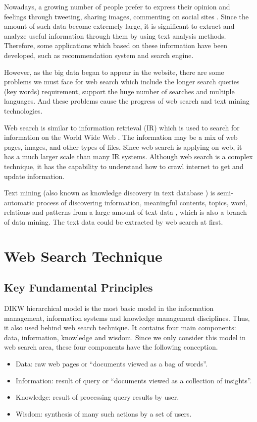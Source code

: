 \documentclass[sigconf]{acmart}
\begin{document}
Nowadays, a growing number of people prefer to express their opinion and feelings through tweeting, sharing images, commenting on social sites \cite{editor01}. Since the amount of such data become extremely large, it is significant to extract and analyze useful information through them by using text analysis methods. Therefore, some applications which based on these information have been developed, such as recommendation system and search engine.

However, as the big data began to appear in the website, there are some problems we must face for web search which include the longer search queries (key words) requirement, support the huge number of searches and multiple languages. And these problems cause the progress of web search and text mining technologies.

Web search is similar to information retrieval (IR) which is used to search for information on the World Wide Web \cite{editor05}. The information may be a mix of web pages, images, and other types of files. Since web search is applying on web, it has a much larger scale than many IR systems. Although web search is a complex technique, it has the capability to understand how to crawl internet to get and update information.

Text mining (also known as knowledge discovery in text database \cite{editor04}) is semi-automatic process of discovering information, meaningful contents, topics, word, relations and patterns from a large amount of text data \cite{editor01}, which is also a branch of data mining. The text data could be extracted by web search at first.

\section{Web Search Technique}

\subsection{Key Fundamental Principles}
DIKW hierarchical model is the most basic model in the information management, information systems and knowledge management disciplines. Thus, it also used behind web search technique. It contains four main components: data, information, knowledge and wisdom. Since we only consider this model in web search area, these four components have the following conception.
\begin{itemize}
\item Data: raw web pages or ``documents viewed as a bag of words''.
\item Information: result of query or ``documents viewed as a collection of insights''.
\item Knowledge: result of processing query results by user.
\item Wisdom: synthesis of many such actions by a set of users.
\end{itemize}
\end{document}
